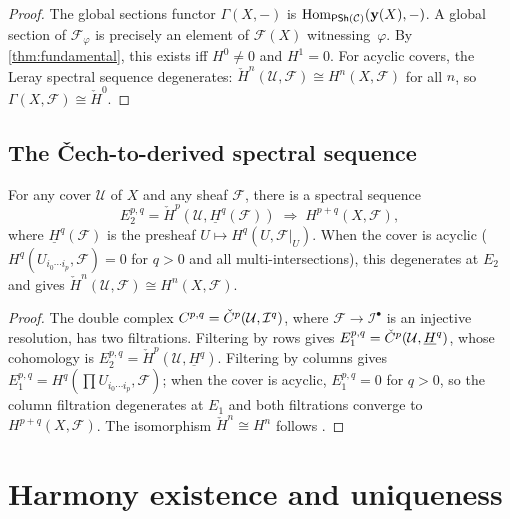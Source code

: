 \begin{proof}
The global sections functor $\Gamma(X, -)$ is
$\mathrm{Hom}_{\mathsf{PSh}(\mathcal{C})}(\mathbf{y}(X), -)$.  A global section of
$\mathcal{F}_\varphi$ is precisely an element of $\mathcal{F}(X)$
witnessing~$\varphi$.  By \cref{thm:fundamental}, this exists iff
$H^0 \neq 0$ and $H^1 = 0$.  For acyclic covers, the Leray spectral
sequence degenerates: $\check{H}^n(\mathcal{U}, \mathcal{F}) \cong
H^n(X, \mathcal{F})$ for all $n$, so
$\Gamma(X, \mathcal{F}) \cong \check{H}^0$.
\end{proof}

\subsection{The \v{C}ech-to-derived spectral sequence}

\begin{proposition}
\label{prop:cech-derived}
For any cover $\mathcal{U}$ of $X$ and any sheaf $\mathcal{F}$, there
is a spectral sequence
\[
  E_2^{p,q} = \check{H}^p(\mathcal{U}, \underline{H}^q(\mathcal{F}))
  \;\Longrightarrow\;
  H^{p+q}(X, \mathcal{F}),
\]
where $\underline{H}^q(\mathcal{F})$ is the presheaf
$U \mapsto H^q(U, \mathcal{F}|_U)$.  When the cover is acyclic
($H^q(U_{i_0 \cdots i_p}, \mathcal{F}) = 0$ for $q > 0$ and all
multi-intersections), this degenerates at $E_2$ and gives
$\check{H}^n(\mathcal{U}, \mathcal{F}) \cong H^n(X, \mathcal{F})$.
\end{proposition}

\begin{proof}
The double complex $C^{p,q} = \check{C}^p(\mathcal{U}, \mathcal{I}^q)$,
where $\mathcal{F} \to \mathcal{I}^\bullet$ is an injective
resolution, has two filtrations.  Filtering by rows gives
$E_1^{p,q} = \check{C}^p(\mathcal{U}, \underline{H}^q)$, whose
cohomology is $E_2^{p,q} = \check{H}^p(\mathcal{U},
\underline{H}^q)$.  Filtering by columns gives $E_1^{p,q} =
H^q(\prod U_{i_0 \cdots i_p}, \mathcal{F})$; when the cover is
acyclic, $E_1^{p,q} = 0$ for $q > 0$, so the column filtration
degenerates at $E_1$ and both filtrations converge to
$H^{p+q}(X, \mathcal{F})$.  The isomorphism
$\check{H}^n \cong H^n$ follows \cite{weibel1994}.
\end{proof}

\section{Harmony existence and uniqueness}
\label{sec:harmony}

